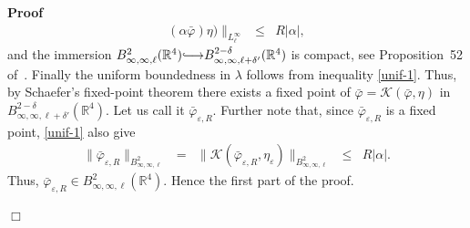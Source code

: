\documentclass{article}
\newcommand{\longhookrightarrow}{{\lhook\joinrel\relbar\joinrel\rightarrow}}
\newcommand{\mathlambda}{\lambda}
\newenvironment{proof}{\noindent\textbf{Proof\ }}{\hspace*{\fill}$\Box$\medskip}
\begin{document}
\begin{proof}
\begin{equation}
\begin{array}{lllll}
      (\alpha \bar{\varphi}) \eta) \|_{L^{\infty}_{\ell}} &
      \leqslant & R | \alpha |,
    \end{array} \label{unif-1}
  \end{equation}
  and the immersion $B^2_{\infty, \infty, \ell} (\mathbb{R}^4)
  \longhookrightarrow B^{2 - \delta}_{\infty, \infty, \ell + \delta'}
  (\mathbb{R}^4)$ is compact, see Proposition~52 of~{\cite{AVG2021}}. Finally
  the uniform boundedness in $\mathlambda$ follows from inequality
  \eqref{unif-1}. Thus, by Schaefer's fixed-point theorem there exists a fixed point of $\bar{\varphi} =\mathcal{K} (\bar{\varphi}, \eta)$ in $B^{2 -
  \delta}_{\infty, \infty, \ell + \delta'} (\mathbb{R}^4)$. Let us call it
  $\bar{\varphi}_{\varepsilon, R}$. Further note that, since
  $\bar{\varphi}_{\varepsilon, R}$ is a fixed point, \eqref{unif-1} also give
  \begin{equation}
    \begin{array}{lllll}
      \| \bar{\varphi}_{\varepsilon, R} \|_{B^2_{\infty, \infty, \ell}} & = & \| \mathcal{K} (\bar{\varphi}_{\varepsilon, R},
       \eta_{\varepsilon}) \|_{B^2_{\infty, \infty, \ell}}       & \leqslant & R | \alpha |.
    \end{array} \label{unif-1temp}
  \end{equation}
  Thus, $\bar{\varphi}_{\varepsilon, R} \in B^2_{\infty, \infty, \ell}
  (\mathbb{R}^4)$. Hence the first part of the proof.
  

\end{proof}
\end{document}
